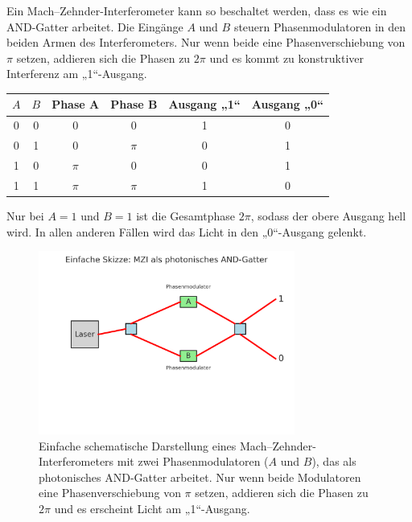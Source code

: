 \begin{tcolorbox}[didaktikbox, title=Photonisches AND-Gatter im Mach--Zehnder-Interferometer, label={box:mzi_and}]
	\small
	Ein Mach--Zehnder-Interferometer kann so beschaltet werden, dass es wie ein \textsc{AND}-Gatter arbeitet. 
	Die Eingänge \(A\) und \(B\) steuern Phasenmodulatoren in den beiden Armen des Interferometers. 
	Nur wenn beide eine Phasenverschiebung von \(\pi\) setzen, addieren sich die Phasen zu \(2\pi\) und es kommt zu konstruktiver Interferenz am „1“-Ausgang.
	
	\begin{center}
		\begin{tabular}{c c c c c c}
			\toprule
			\(A\) & \(B\) & Phase A & Phase B & Ausgang „1“ & Ausgang „0“ \\
			\midrule
			0 & 0 & \(0\) & \(0\) & 1 & 0 \\
			0 & 1 & \(0\) & \(\pi\) & 0 & 1 \\
			1 & 0 & \(\pi\) & \(0\) & 0 & 1 \\
			1 & 1 & \(\pi\) & \(\pi\) & 1 & 0 \\
			\bottomrule
		\end{tabular}
	\end{center}
	
	Nur bei \(A=1\) und \(B=1\) ist die Gesamtphase \(2\pi\), sodass der obere Ausgang hell wird. 
	In allen anderen Fällen wird das Licht in den „0“-Ausgang gelenkt.
\end{tcolorbox}
\begin{figure}[H]
	\centering
	\includegraphics[width=0.75\textwidth]{bilder/mzi_and_simple.png} %
	\caption{Einfache schematische Darstellung eines Mach--Zehnder-Interferometers mit zwei Phasenmodulatoren (\(A\) und \(B\)), das als photonisches \textsc{AND}-Gatter arbeitet. Nur wenn beide Modulatoren eine Phasenverschiebung von \(\pi\) setzen, addieren sich die Phasen zu \(2\pi\) und es erscheint Licht am „1“-Ausgang.}
	\label{fig:mzi_and_simple}
\end{figure}

